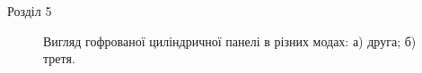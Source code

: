 \documentclass[8pt]{beamer}
\numberwithin{figure}{section}
\numberwithin{equation}{section}
\numberwithin{table}{section}
\begin{document}
\begin{frame}{Розділ 5}
\begin{figure}[h]
\begin{minipage}[h]{0.49\linewidth}
\end{minipage}
\hfill
\begin{minipage}[h]{0.49\linewidth}
\end{minipage}
\caption{Вигляд гофрованої циліндричної панелі в різних модах: а) друга; б) третя.}
\end{figure}
\end{frame}
\end{document}
